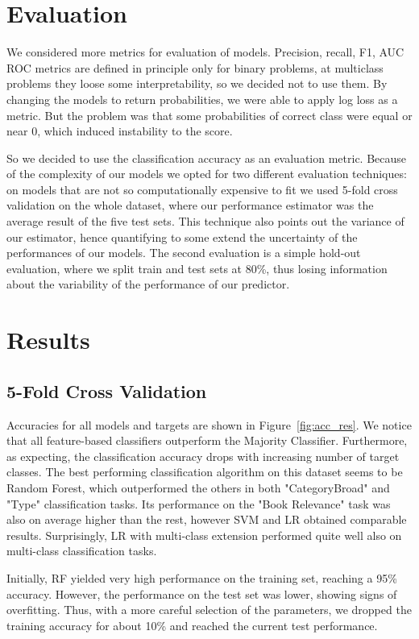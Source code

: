 \documentclass[11pt,a4paper]{article}
\begin{document}
\section{Evaluation}
We considered more metrics for evaluation of models. Precision, recall, F1, AUC ROC metrics are defined in principle only for binary problems, at multiclass problems they loose some interpretability, so we decided not to use them. By changing the models to return probabilities, we were able to apply log loss as a metric. But the problem was that some probabilities of correct class were equal or near 0, which induced instability to the score.

So we decided to use the classification accuracy as an evaluation metric. Because of the complexity of our models we opted for two different evaluation techniques: on models that are not so computationally expensive to fit we used 5-fold cross validation on the whole dataset, where our performance estimator was the average result of the five test sets. This technique also points out the variance of our estimator, hence quantifying to some extend the uncertainty of the performances of our models. The second evaluation is a simple hold-out evaluation, where we split train and test sets at 80\%, thus losing information about the variability of the performance of our predictor.

\section{Results}
\subsection{5-Fold Cross Validation}

Accuracies for all models and targets are shown in Figure~\ref{fig:acc_res}. We notice that all feature-based classifiers outperform the Majority Classifier. Furthermore, as expecting, the classification accuracy drops with increasing number of target classes. The best performing classification algorithm on this dataset seems to be Random Forest, which outperformed the others in both "CategoryBroad" and "Type" classification tasks. Its performance on the "Book Relevance" task was also on average higher than the rest, however SVM and LR obtained comparable results. Surprisingly, LR with multi-class extension performed quite well also on multi-class classification tasks.

Initially, RF yielded very high performance on the training set, reaching a 95\% accuracy. However, the performance on the test set was lower, showing signs of overfitting. Thus, with a more careful selection of the parameters, we dropped the training accuracy for about 10\% and reached the current test performance.
\end{document}
